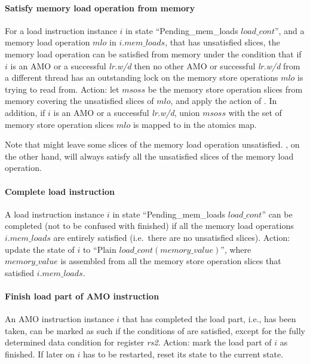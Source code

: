 \paragraph{Satisfy memory load operation from memory}\label{omm:thread:sat_from_mem}
For a load instruction instance $i$ in state ``{\sc Pending\_mem\_loads} $load\_cont$'', and a memory load operation $mlo$ in $i.mem\_loads$, that has unsatisfied slices, the memory load operation can be satisfied from memory under the condition that if $i$ is an AMO or a successful {\em lr.w/d} then no other AMO or successful {\em lr.w/d} from a different thread has an outstanding lock on the memory store operations $mlo$ is trying to read from.
Action: let $msoss$ be the memory store operation slices from memory covering the unsatisfied slices of $mlo$, and apply the action of .
In addition, if $i$ is an AMO or a successful {\em lr.w/d}, union $msoss$ with the set of memory store operation slices $mlo$ is mapped to in the atomics map.

\begin{commentary}
Note that  might leave some slices of the memory load operation unsatisfied.
, on the other hand, will always satisfy all the unsatisfied slices of the memory load operation.
\end{commentary}


\paragraph{Complete load instruction}\label{omm:thread:complete_load}
A load instruction instance $i$ in state ``{\sc Pending\_mem\_loads} $load\_cont$'' can be completed (not to be confused with finished) if all the memory load operations $i.mem\_loads$ are entirely satisfied (i.e.~there are no unsatisfied slices).
Action: update the state of $i$ to ``{\sc Plain} $load\_cont(memory\_value)$'', where $memory\_value$ is assembled from all the memory store operation slices that satisfied $i.mem\_loads$.


\paragraph{Finish load part of AMO instruction}\label{omm:thread:finish_load_part}
An AMO instruction instance $i$ that has completed the load part, i.e.,  has been taken, can be marked as such if the conditions of  are satisfied, except for the fully determined data condition for register {\em rs2}.
Action: mark the load part of $i$ as finished. If later on $i$ has to be restarted, reset its state to the current state.


